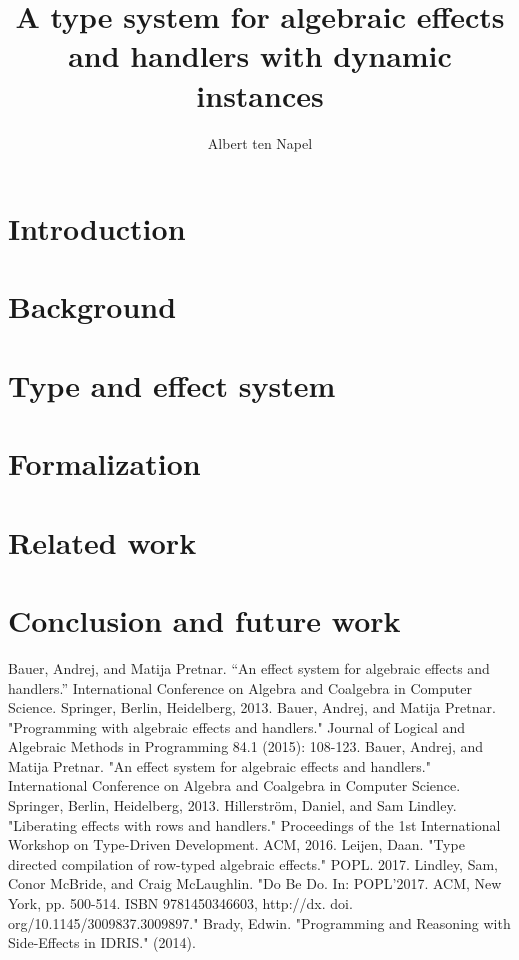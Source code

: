 \documentclass[12pt]{book}
\title{A type system for algebraic effects and handlers with dynamic instances}
\author{Albert ten Napel}
\date{}
\begin{document}
\maketitle

\tableofcontents
\newpage

\chapter{Introduction}


\chapter{Background}



\chapter{Type and effect system}



\chapter{Formalization}


\chapter{Related work}


\chapter{Conclusion and future work}


\newpage
\begin{thebibliography}{9}
Bauer, Andrej, and Matija Pretnar. ``An effect system for algebraic effects and handlers.'' International Conference on Algebra and Coalgebra in Computer Science. Springer, Berlin, Heidelberg, 2013.
Bauer, Andrej, and Matija Pretnar. "Programming with algebraic effects and handlers." Journal of Logical and Algebraic Methods in Programming 84.1 (2015): 108-123.
Bauer, Andrej, and Matija Pretnar. "An effect system for algebraic effects and handlers." International Conference on Algebra and Coalgebra in Computer Science. Springer, Berlin, Heidelberg, 2013.
Hillerstr\"{o}m, Daniel, and Sam Lindley. "Liberating effects with rows and handlers." Proceedings of the 1st International Workshop on Type-Driven Development. ACM, 2016.
Leijen, Daan. "Type directed compilation of row-typed algebraic effects." POPL. 2017.
Lindley, Sam, Conor McBride, and Craig McLaughlin. "Do Be Do. In: POPL'2017. ACM, New York, pp. 500-514. ISBN 9781450346603, http://dx. doi. org/10.1145/3009837.3009897."
Brady, Edwin. "Programming and Reasoning with Side-Effects in IDRIS." (2014).
\end{thebibliography}
\end{document}
